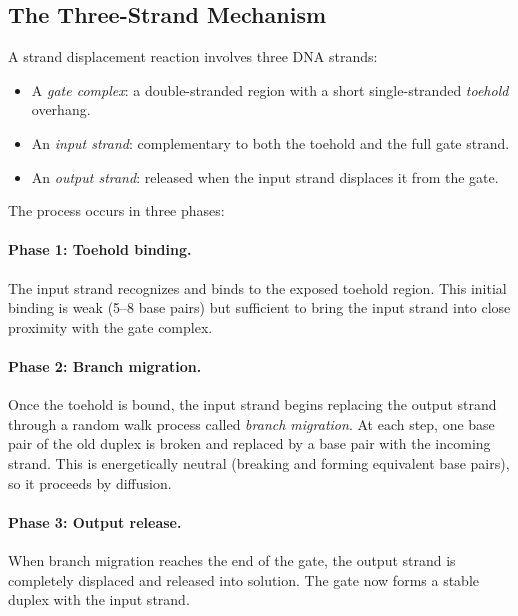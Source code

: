 \subsection{The Three-Strand Mechanism}

A strand displacement reaction involves three DNA strands:
\begin{itemize}[leftmargin=1.8em]
  \item A \emph{gate complex}: a double-stranded region with a short single-stranded \emph{toehold} overhang.
  \item An \emph{input strand}: complementary to both the toehold and the full gate strand.
  \item An \emph{output strand}: released when the input strand displaces it from the gate.
\end{itemize}

The process occurs in three phases:

\paragraph{Phase 1: Toehold binding.}
The input strand recognizes and binds to the exposed toehold region. This initial binding is weak (5--8 base pairs) but sufficient to bring the input strand into close proximity with the gate complex.

\paragraph{Phase 2: Branch migration.}
Once the toehold is bound, the input strand begins replacing the output strand through a random walk process called \emph{branch migration}. At each step, one base pair of the old duplex is broken and replaced by a base pair with the incoming strand. This is energetically neutral (breaking and forming equivalent base pairs), so it proceeds by diffusion.

\paragraph{Phase 3: Output release.}
When branch migration reaches the end of the gate, the output strand is completely displaced and released into solution. The gate now forms a stable duplex with the input strand.


